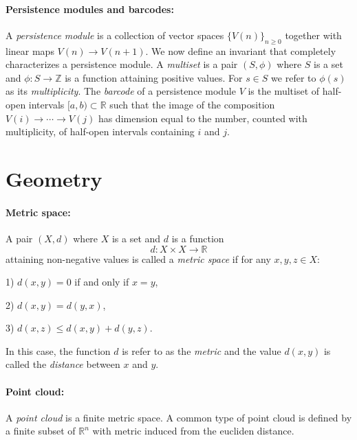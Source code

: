 \documentclass{article}
\begin{document}
	\paragraph{Persistence modules and barcodes:} A \textit{persistence module} is a collection of vector spaces $\{V(n)\}_{n \geq 0}$ together with linear maps $V(n) \to V(n+1)$. We now define an invariant that completely characterizes a persistence module.  A \textit{multiset} is a pair $(S, \phi)$ where $S$ is a set and  $\phi : S \to \mathbb Z$ is a function attaining positive values. For $s \in S$ we refer to $\phi(s)$ as its \textit{multiplicity}. The \textit{barcode} of a persistence module $V$ is the multiset of half-open intervals $[a,b) \subset \mathbb R$ such that the image of the composition $V(i) \to \cdots \to V(j)$ has dimension equal to the number, counted with multiplicity, of half-open intervals containing $i$ and $j$.
	
	\section{Geometry}
	
	\paragraph{Metric space:} A  pair $(X, d)$ where $X$ is a set and $d$ is a function 
	$$
	d : X \times X \to \mathbb R
	$$
	attaining non-negative values is called a \textit{metric space} if for any $x, y, z \in X$:
	
	1) $d(x,y) = 0$ if and only if $x = y$,
	
	2) $d(x,y) = d(y,x)$, 
	
	3) $d(x,z) \leq d(x,y) + d(y, z)$.
	
	In this case, the function $d$ is refer to as the \textit{metric} and the value $d(x,y)$ is called the \textit{distance} between $x$ and $y$. 
	
	\paragraph{Point cloud:} A \textit{point cloud} is a finite metric space. A common type of point cloud is defined by a finite subset of $\mathbb R^n$ with metric induced from the eucliden distance.
	
\end{document}
